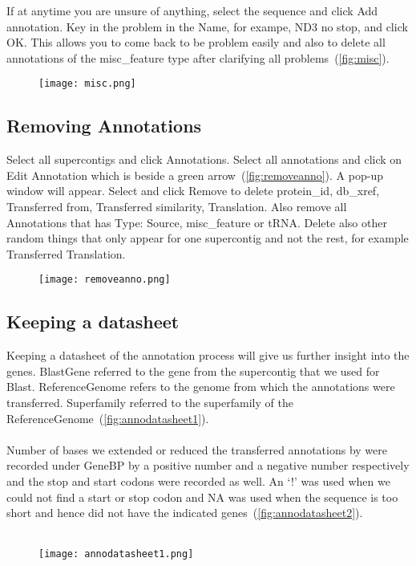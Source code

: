 \documentclass[11pt]{article}
\begin{document}
If at anytime you are unsure of anything, select the sequence and click Add annotation. Key in the problem in the Name, for exampe, ND3 no stop, and click OK. This allows you to come back to be problem easily and also to delete all annotations of the misc\_feature type after clarifying all problems~(\autoref{fig:misc}).

\begin{figure}[H]
  \centering
    \texttt{[image: misc.png]}
  \label{fig:misc}
\end{figure}

\subsection{Removing Annotations}
\label{subsec:Removing}
Select all supercontigs and click Annotations. Select all annotations and click on Edit Annotation which is beside a green arrow~(\autoref{fig:removeanno}). A pop-up window will appear. Select and click Remove to delete protein\_id, db\_xref, Transferred from, Transferred similarity, Translation. Also remove all Annotations that has Type: Source, misc\_feature or tRNA. Delete also other random things that only appear for one supercontig and not the rest, for example Transferred Translation.

\begin{figure}[H]
  \centering
    \texttt{[image: removeanno.png]}
  \label{fig:removeanno}
\end{figure}

\subsection{Keeping a datasheet}
Keeping a datasheet of the annotation process will give us further insight into the genes. BlastGene referred to the gene from the supercontig that we used for Blast. ReferenceGenome refers to the genome from which the annotations were transferred. Superfamily referred to the superfamily of the ReferenceGenome~(\autoref{fig:annodatasheet1}). 
\\
\\
Number of bases we extended or reduced the transferred annotations by were recorded under GeneBP by a positive number and a negative number respectively and the stop and start codons were recorded as well. An `!' was used when we could not find a start or stop codon and NA was used when the sequence is too short and hence did not have the indicated genes~(\autoref{fig:annodatasheet2}). 
\\
\\
\begin{figure}[H]
  \centering
    \texttt{[image: annodatasheet1.png]}
  \label{fig:annodatasheet1}
\end{figure}
\end{document}
